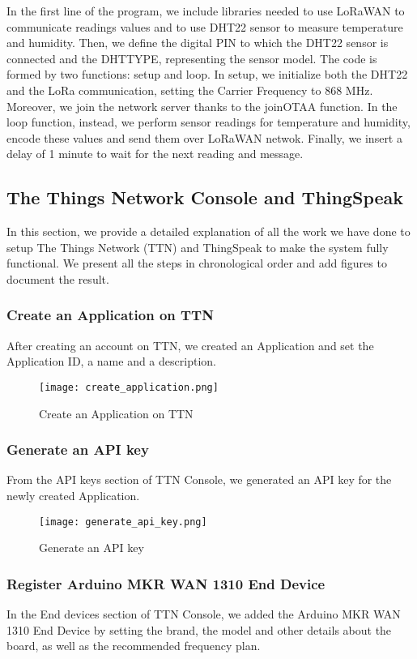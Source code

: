 In the first line of the program, we include libraries needed to use LoRaWAN to communicate readings values and to use DHT22 sensor to measure temperature and humidity. Then, we define the digital PIN to which the DHT22 sensor is connected and the DHTTYPE, representing the sensor model. The code is formed by two functions: setup and loop. In setup, we initialize both the DHT22 and the LoRa communication, setting the Carrier Frequency to 868 MHz. Moreover, we join the network server thanks to the joinOTAA function. In the loop function, instead, we perform sensor readings for temperature and humidity, encode these values and send them over LoRaWAN netwok. Finally, we insert a delay of 1 minute to wait for the next reading and message.
	 
\subsection{The Things Network Console and ThingSpeak}
In this section, we provide a detailed explanation of all the work we have done to setup The Things Network (TTN) and ThingSpeak to make the system fully functional. We present all the steps in chronological order and add figures to document the result.
\subsubsection{Create an Application on TTN}
After creating an account on TTN, we created an Application and set the Application ID, a name and a description.

\begin{figure}[H]
    \centering
    \texttt{[image: create\_application.png]}
    \caption{Create an Application on TTN}
\end{figure}

\subsubsection{Generate an API key}
From the API keys section of TTN Console, we generated an API key for the newly created Application.

\begin{figure}[H]
    \centering
    \texttt{[image: generate\_api\_key.png]}
    \caption{Generate an API key}
\end{figure}

\subsubsection{Register Arduino MKR WAN 1310 End Device}
In the End devices section of TTN Console, we added the Arduino MKR WAN 1310 End Device by setting the brand, the model and other details about the board, as well as the recommended frequency plan. 

